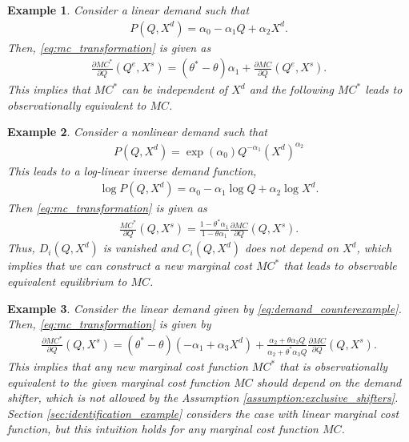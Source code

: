 \documentclass[11pt, a4paper]{article}
\newtheorem{example}{Example}
\theoremstyle{remark}
\begin{document}
\begin{example}\label{example:bresnahan_1982}
    Consider a linear demand such that
    \begin{align}
        P(Q, X^{d}) = \alpha_0 - \alpha_1Q + \alpha_2X^{d}.
    \end{align}
    Then, \eqref{eq:mc_transformation} is given as
    \begin{align}
        \frac{\partial MC^{*}}{\partial Q}(Q^e, X^{s}) = (\theta^{*} - \theta)\alpha_1 + \frac{\partial MC}{\partial Q}(Q^e, X^{s}).
    \end{align}
    This implies that $MC^{*}$ can be independent of $X^{d}$ and the following $MC^{*}$ leads to observationally equivalent to $MC$.
\end{example}
\begin{example}\label{example:log_linear}
    Consider a nonlinear demand such that
    \begin{align}
        P(Q, X^{d}) = \exp(\alpha_0)Q^{-\alpha_1}(X^{d})^{\alpha_2}
    \end{align}
    This leads to a log-linear inverse demand function,
    \begin{align}
        \log P(Q, X^{d} ) = \alpha_0 - \alpha_1 \log Q + \alpha_2 \log X^{d}.
    \end{align}
    Then \eqref{eq:mc_transformation} is given as
    \begin{align}
        \frac{MC^{*}}{\partial Q}(Q, X^{s}) = \frac{1 - \theta^{*} \alpha_1}{1 - \theta \alpha_1} \frac{\partial MC}{\partial Q}(Q, X^{s}). 
    \end{align}
    Thus, $D_i(Q, X^{d})$ is vanished and $C_i(Q,X^{d})$ does not depend on $X^{d}$, which implies that we can construct a new marginal cost $MC^{*}$ that leads to observable equivalent equilibrium to $MC$.
\end{example}

\begin{example}\label{example:demand_counterexample}
    Consider the linear demand given by \eqref{eq:demand_counterexample}.
    Then, \eqref{eq:mc_transformation} is given by
    \begin{align}
        \frac{\partial MC^{*}}{\partial Q}(Q, X^{s}) = (\theta^{*} - \theta)(-\alpha_1 + \alpha_3X^{d}) +  \frac{\alpha_2 + \theta\alpha_3Q}{\alpha_2 + \theta^{*}\alpha_3Q}\frac{\partial MC}{\partial Q}(Q, X^{s}).
    \end{align}
    This implies that any new marginal cost function $MC^{*}$ that is observationally equivalent to the given marginal cost function $MC$ should depend on the demand shifter, which is not allowed by the Assumption \ref{assumption:exclusive_shifters}.
    Section \ref{sec:identification_example} considers the case with linear marginal cost function, but this intuition holds for any marginal cost function $MC$.
\end{example}
\end{document}
